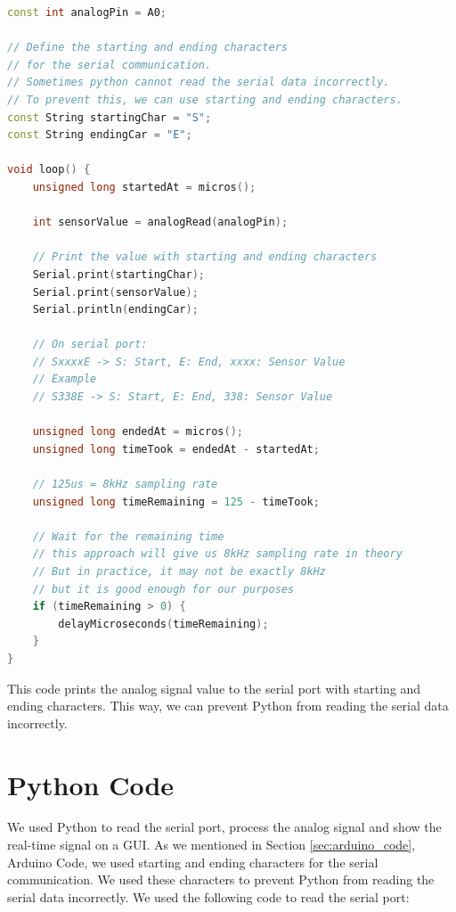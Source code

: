 \begin{lstlisting}[language=C++, caption=Arduino Code with Start and End Characters, label=lst:arduino_code_start_end]
const int analogPin = A0;

// Define the starting and ending characters 
// for the serial communication. 
// Sometimes python cannot read the serial data incorrectly. 
// To prevent this, we can use starting and ending characters.
const String startingChar = "S";
const String endingCar = "E";

void loop() {
    unsigned long startedAt = micros();

    int sensorValue = analogRead(analogPin);
    
    // Print the value with starting and ending characters
    Serial.print(startingChar);
    Serial.print(sensorValue);
    Serial.println(endingCar);

    // On serial port: 
    // SxxxxE -> S: Start, E: End, xxxx: Sensor Value
    // Example
    // S338E -> S: Start, E: End, 338: Sensor Value

    unsigned long endedAt = micros();
    unsigned long timeTook = endedAt - startedAt;

    // 125us = 8kHz sampling rate
    unsigned long timeRemaining = 125 - timeTook;

    // Wait for the remaining time
    // this approach will give us 8kHz sampling rate in theory
    // But in practice, it may not be exactly 8kHz 
    // but it is good enough for our purposes
    if (timeRemaining > 0) {
        delayMicroseconds(timeRemaining);
    }
}
\end{lstlisting}

This code prints the analog signal value to the serial port with starting and ending characters. This way, we can prevent Python from reading the serial data incorrectly. 

\newpage
\thispagestyle{plain}

\section{Python Code}

We used Python to read the serial port, process the analog signal and show the real-time signal on a GUI. As we mentioned in Section \ref{sec:arduino_code}, Arduino Code, we used starting and ending characters for the serial communication. We used these characters to prevent Python from reading the serial data incorrectly. We used the following code to read the serial port:


